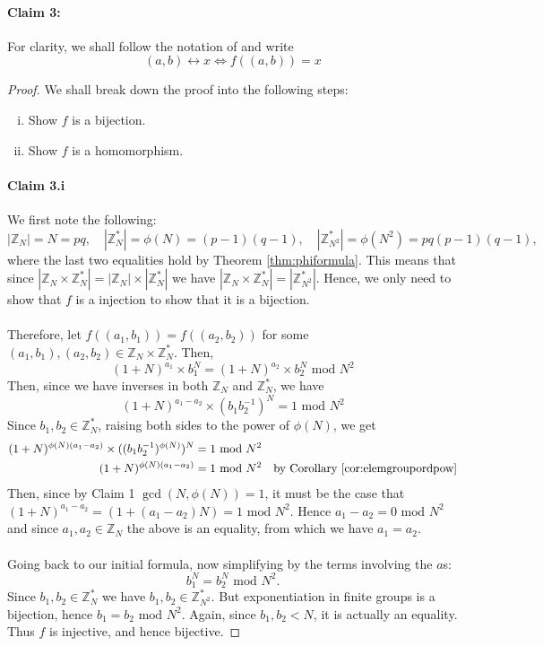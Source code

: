 \documentclass{article}
\theoremstyle{definition}
\theoremstyle{example}
\newcommand{\Int}{\mathbb{Z}}
\renewcommand{\mod}{\,\,\text{mod}\,\,}
\begin{document}
\paragraph{Claim 3:}
For clarity, we shall follow the notation of \cite{katz2014introduction} and
write
\[
  (a, b) \leftrightarrow x \Leftrightarrow f((a,b)) = x
\]
\begin{proof}
  We shall break down the proof into the following steps:
  \begin{enumerate}[i.]
  \item Show $f$ is a bijection.
  \item Show $f$ is a homomorphism.
  \end{enumerate}
  \paragraph{Claim 3.i} We first note the following:
  \[
    |\Int_{N}| = N = pq,\quad
    |\Int_{N}^*| = \phi(N) = (p - 1)(q - 1),\quad
    |\Int_{N^2}^*| = \phi(N^2) = pq(p - 1)(q - 1),
  \]
  where the last two equalities hold by Theorem \ref{thm:phiformula}.
  This means that since $|\Int_{N} \times \Int_{N}^*| = |\Int_{N}|
  \times |\Int_{N}^*|$ we have $|\Int_{N} \times \Int_{N}^*| = |\Int_{N^2}^*|$.
  Hence, we only need to show that $f$ is a injection to show that it is a bijection.
  \paragraph{}
  Therefore, let $f((a_1, b_1)) = f((a_2, b_2))$ for some $(a_1, b_1), (a_2,
  b_2) \in \Int_{N} \times \Int_{N}^*$. Then,
  \[
    (1 + N)^{a_1}\times b_1^N = (1 + N)^{a_2}\times b_2^N\mod N^2
  \]
  Then, since we have inverses in both $\Int_N$ and $\Int_N^*$, we have
  \[
    (1 + N)^{a_1 - a_2}\times (b_1b_2^{-1})^N = 1 \mod N^2
  \]
  Since $b_1, b_2 \in \Int_N^*$, raising both sides to the power of $\phi(N)$,
  we get
  \begin{align*}
    (1 + N)^{\phi(N)(a_1 - a_2)} \times ((b_1b_2^{-1})^{\phi(N)})^N &= 1 \mod N^2 \\
    (1 + N)^{\phi(N)(a_1 - a_2)}  &= 1 \mod N^2\quad\text{by Corollary \ref{cor:elemgroupordpow}}
  \end{align*}
  Then, since by Claim 1 $\gcd(N, \phi(N)) = 1$, it must be the case that $(1 +
  N)^{a_1 - a_2} = (1 + (a_1 - a_2)N) = 1 \mod N^2$. Hence $a_1 - a_2 = 0 \mod N^2$
  and since $a_1, a_2 \in \Int_N$ the above is an equality, from which we have
  $a_1 = a_2$.
  \paragraph{} Going back to our initial formula, now simplifying by the terms
  involving the $a$s:
  \[
    b_1^N = b_2^N \mod N^2.
  \]
  Since $b_1, b_2 \in \Int_N^*$ we have $b_1, b_2\in \Int_{N^2}^*$. But
  exponentiation in finite groups is a bijection, hence $b_1 = b_2 \mod N^2$.
  Again, since $b_1, b_2 < N$, it is actually an equality. Thus $f$ is
  injective, and hence bijective.

\end{proof}
\end{document}
